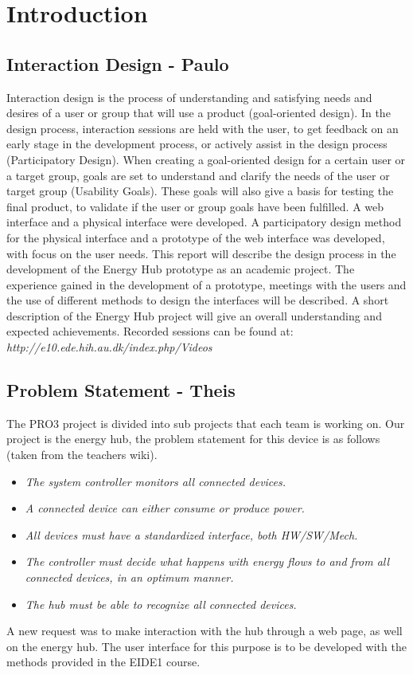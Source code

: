 \chapter{Introduction}
\section{Interaction Design - Paulo}
Interaction design is the process of understanding and satisfying needs and desires of a user or group that will use a product (goal-oriented design). In the design process, interaction sessions are held with the user, to get feedback on an early stage in the development process, or actively assist in the design process (Participatory Design).
When creating a goal-oriented design for a certain user or a target group, goals are set to understand and clarify the needs of the user or target group (Usability Goals). These goals will also give a basis for testing the final product, to validate if the user or group goals have been fulfilled.
\p
A web interface and a physical interface were developed. A participatory design method for the physical interface and a prototype of the web interface was developed, with focus on the user needs.
\p
This report will describe the design process in the development of the Energy Hub prototype as an academic project. The experience gained in the development of a prototype, meetings with the users and the use of different methods to design the interfaces will be described. A short description of the Energy Hub project will give an overall understanding and expected achievements.
\p
Recorded sessions can be found at: \textit{http://e10.ede.hih.au.dk/index.php/Videos}
\section{Problem Statement - Theis}
The PRO3 project is divided into sub projects that each team is working on. Our project is the energy hub, the problem statement for this device is as follows (taken from the teachers wiki).
\begin{itemize}
	\item\textit{The system controller monitors all connected devices.}
	\item\textit{A connected device can either consume or produce power.}
	\item\textit{All devices must have a standardized interface, both HW/SW/Mech.}
	\item\textit{The controller must decide what happens with energy flows to and from all connected devices, in an optimum manner.}
	\item\textit{The hub must be able to recognize all connected devices.}
\end{itemize}
A new request was to make interaction with the hub through a web page, as well on the energy hub. The user interface for this purpose is to be developed with the methods provided in the EIDE1 course.


